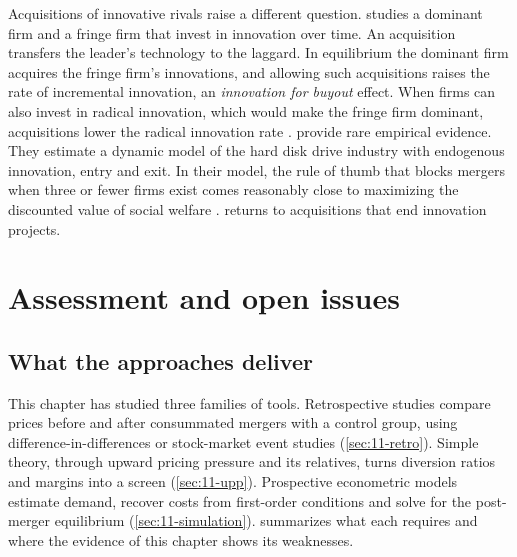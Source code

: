 Acquisitions of innovative rivals raise a different question. \citet{Cabral2018} studies a dominant firm and a fringe
firm that invest in innovation over time. An acquisition transfers the leader's technology to the laggard. In
equilibrium the dominant firm acquires the fringe firm's innovations, and allowing such acquisitions raises the rate of
incremental innovation, an \emph{innovation for buyout} effect. When firms can also invest in radical innovation, which
would make the fringe firm dominant, acquisitions lower the radical innovation rate \citep[p.~236]{AskerNocke2021}.
\citet{IgamiUetake2019} provide rare empirical evidence. They estimate a dynamic model of the hard disk drive
industry with endogenous innovation, entry and exit. In their model, the rule of thumb that blocks mergers when three
or fewer firms exist comes reasonably close to maximizing the discounted value of social welfare
\citep[p.~264]{AskerNocke2021}.  returns to acquisitions that end innovation projects.

\section{Assessment and open issues}\label{sec:11-discussion}

\subsection{What the approaches deliver}\label{sec:11-approaches}

This chapter has studied three families of tools. Retrospective studies compare prices before and after consummated
mergers with a control group, using difference-in-differences or stock-market event studies (\cref{sec:11-retro}).
Simple theory, through upward pricing pressure and its relatives, turns diversion ratios and margins into a screen
(\cref{sec:11-upp}). Prospective econometric models estimate demand, recover costs from first-order conditions and
solve for the post-merger equilibrium (\cref{sec:11-simulation}).  summarizes what each requires
and where the evidence of this chapter shows its weaknesses.

